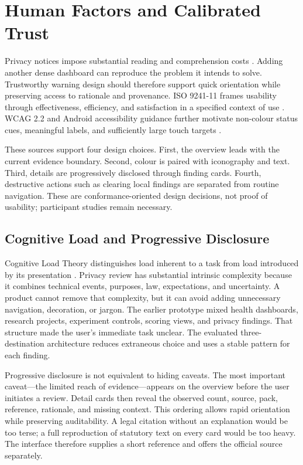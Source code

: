 \section{Human Factors and Calibrated Trust}

Privacy notices impose substantial reading and comprehension costs \cite{mcdonald2008,obar2020}. Adding another dense dashboard can reproduce the problem it intends to solve. Trustworthy warning design should therefore support quick orientation while preserving access to rationale and provenance. ISO 9241-11 frames usability through effectiveness, efficiency, and satisfaction in a specified context of use \cite{iso924111}. WCAG 2.2 and Android accessibility guidance further motivate non-colour status cues, meaningful labels, and sufficiently large touch targets \cite{wcag22,androidAccessibility}.

These sources support four design choices. First, the overview leads with the current evidence boundary. Second, colour is paired with iconography and text. Third, details are progressively disclosed through finding cards. Fourth, destructive actions such as clearing local findings are separated from routine navigation. These are conformance-oriented design decisions, not proof of usability; participant studies remain necessary.

\subsection{Cognitive Load and Progressive Disclosure}

Cognitive Load Theory distinguishes load inherent to a task from load introduced by its presentation \cite{sweller2011}. Privacy review has substantial intrinsic complexity because it combines technical events, purposes, law, expectations, and uncertainty. A product cannot remove that complexity, but it can avoid adding unnecessary navigation, decoration, or jargon. The earlier prototype mixed health dashboards, research projects, experiment controls, scoring views, and privacy findings. That structure made the user's immediate task unclear. The evaluated three-destination architecture reduces extraneous choice and uses a stable pattern for each finding.

Progressive disclosure is not equivalent to hiding caveats. The most important caveat---the limited reach of evidence---appears on the overview before the user initiates a review. Detail cards then reveal the observed count, source, pack, reference, rationale, and missing context. This ordering allows rapid orientation while preserving auditability. A legal citation without an explanation would be too terse; a full reproduction of statutory text on every card would be too heavy. The interface therefore supplies a short reference and offers the official source separately.

